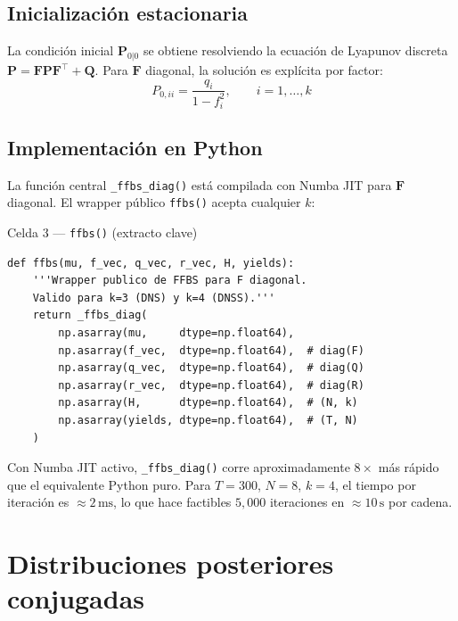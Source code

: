 \documentclass[12pt, a4paper]{article}
\theoremstyle{plain}
\theoremstyle{definition}
\theoremstyle{remark}
\newcommand{\bF}{\mathbf{F}}
\newcommand{\bQ}{\mathbf{Q}}
\newcommand{\bP}{\mathbf{P}}
\begin{document}
\subsection{Inicialización estacionaria}

La condición inicial $\bP_{0|0}$ se obtiene resolviendo la ecuación de
Lyapunov discreta $\bP = \bF\bP\bF^\top + \bQ$. Para $\bF$ diagonal,
la solución es explícita por factor:
\begin{equation}
  P_{0,ii} = \frac{q_i}{1 - f_i^2}, \qquad i = 1,\ldots,k
  \label{eq:lyapunov}
\end{equation}

\subsection{Implementación en Python}

La función central \texttt{\_ffbs\_diag()} está compilada con Numba JIT
para $\bF$ diagonal. El wrapper público \texttt{ffbs()} acepta cualquier $k$:

\begin{codigocaja}{Celda 3 — \texttt{ffbs()} (extracto clave)}
\begin{lstlisting}
def ffbs(mu, f_vec, q_vec, r_vec, H, yields):
    '''Wrapper publico de FFBS para F diagonal.
    Valido para k=3 (DNS) y k=4 (DNSS).'''
    return _ffbs_diag(
        np.asarray(mu,     dtype=np.float64),
        np.asarray(f_vec,  dtype=np.float64),  # diag(F)
        np.asarray(q_vec,  dtype=np.float64),  # diag(Q)
        np.asarray(r_vec,  dtype=np.float64),  # diag(R)
        np.asarray(H,      dtype=np.float64),  # (N, k)
        np.asarray(yields, dtype=np.float64),  # (T, N)
    )
\end{lstlisting}
\end{codigocaja}

\begin{tipbox}[Velocidad]
Con Numba JIT activo, \texttt{\_ffbs\_diag()} corre aproximadamente $8\times$
más rápido que el equivalente Python puro. Para $T=300$, $N=8$, $k=4$,
el tiempo por iteración es $\approx 2\,\text{ms}$, lo que hace factibles
$5{,}000$ iteraciones en $\approx 10\,\text{s}$ por cadena.
\end{tipbox}

\section{Distribuciones posteriores conjugadas}
\end{document}
